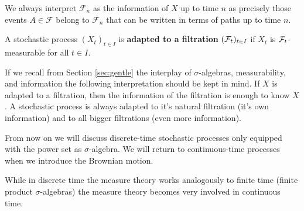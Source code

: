 	We always interpret $\mathcal F_n$ as the information of $X$ up to time $n$ as precisely those events $A\in \mathcal F$ belong to $\mathcal F_n$ that can be written in terms of paths up to time $n$.
\begin{ldef}
\begin{deff}
	A stochastic process $(X_t)_{t\in I}$ is \textbf{adapted to a filtration} $(\mathcal{F}_t)_{t\in I}$ if $X_t$ is $\mathcal{F}_t$-measurable for all $t\in I$.
\end{deff}
\end{ldef}
If we recall from Section \ref{sec:gentle} the interplay of $\sigma$-algebras, measurability, and information the following interpretation should be kept in mind. If $X$ is adapted to a filtration, then the information of the filtration is enough to know $X$. A stochastic process is always adapted to it's natural filtration (it's own information) and to all bigger filtrations (even more information).\smallskip

\begin{lwarnhinweis}
From now on we will discuss discrete-time stochastic processes only equipped with the power set as $\sigma$-algebra. We will return to continuous-time processes when we introduce the Brownian motion. 
\end{lwarnhinweis}
While in discrete time the measure theory works analogously to finite time (finite product $\sigma$-algebras) the measure theory   becomes very involved in continuous time.

